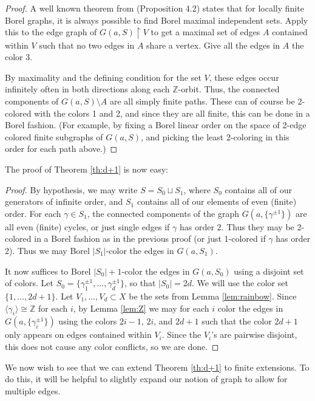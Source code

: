 \documentclass[12pt]{article}
\newcommand{\0}{\varnothing}
\newcommand{\Z}{\mathbb{Z}}
\newcommand{\res}{\upharpoonright}
\begin{document}
\begin{proof}
A well known theorem from \cite{KST} (Proposition 4.2) states that for locally finite Borel graphs, it is always possible to find Borel maximal independent sets. Apply this to the edge graph of $G(a,S) \res V$ to get a maximal set of edges $A$ contained within $V$ such that no two edges in $A$ share a vertex. Give all the edges in $A$ the color 3.

By maximality and the defining condition for the set $V$, these edges occur infinitely often in both directions along each $\Z$-orbit. Thus, the connected components of $G(a,S) \setminus A$ are all simply finite paths. These can of course be 2-colored with the colors 1 and 2, and since they are all finite, this can be done in a Borel fashion. (For example, by fixing a Borel linear order on the space of 2-edge colored finite subgraphs of $G(a,S)$, and picking the least 2-coloring in this order for each path above.)
\end{proof}

The proof of Theorem \ref{th:d+1} is now easy:

\begin{proof}
By hypothesis, we may write $S = S_0 \sqcup S_1$, where $S_0$ contains all of our generators of infinite order, and $S_1$ contains all of our elements of even (finite) order. For each $\gamma \in S_1$, the connected components of the graph $G(a,\{\gamma^{\pm 1} \})$ are all even (finite) cycles, or just single edges if $\gamma$ has order 2. Thus they may be 2-colored in a Borel fashion as in the previous proof (or just 1-colored if $\gamma$ has order 2). Thus we may Borel $|S_1|$-color the edges in $G(a,S_1)$.

It now suffices to Borel $|S_0|+1$-color the edges in $G(a,S_0)$ using a disjoint set of colors. Let $S_0 = \{\gamma_1^{\pm 1},\ldots,\gamma_d^{\pm 1}\}$, so that $|S_0| = 2d$. We will use the color set $\{1,\ldots,2d+1\}$. Let $V_1,\ldots,V_d \subset X$ be the sets from Lemma \ref{lem:rainbow}. Since $\langle \gamma_i \rangle \cong \Z$ for each $i$, by Lemma \ref{lem:Z} we may for each $i$ color the edges in $G(a,\{ \gamma_i^{\pm 1} \})$ using the colors $2i-1$, $2i$, and $2d+1$ such that the color $2d+1$ only appears on edges contained within $V_i$. Since the $V_i$'s are pairwise disjoint, this does not cause any color conflicts, so we are done.
\end{proof}

We now wish to see that we can extend Theorem \ref{th:d+1} to finite extensions. To do this, it will be helpful to slightly expand our notion of graph to allow for multiple edges.
\end{document}
